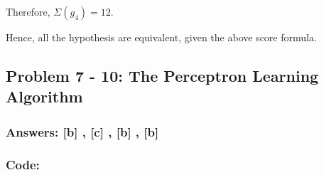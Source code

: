 \documentclass[11pt]{article}
\begin{document}
Therefore, \(\Sigma(g_4)= 12\).

Hence, all the hypothesis are equivalent, given the above score formula.

    \hypertarget{problem-7---10-the-perceptron-learning-algorithm}{%
\subsection{Problem 7 - 10: The Perceptron Learning
Algorithm}\label{problem-7---10-the-perceptron-learning-algorithm}}

\hypertarget{answers-b-c-b-b}{%
\subsubsection{Answers: {[}b{]} , {[}c{]} , {[}b{]} ,
{[}b{]}}\label{answers-b-c-b-b}}

\hypertarget{code}{%
\subsubsection{Code:}\label{code}}
\end{document}
